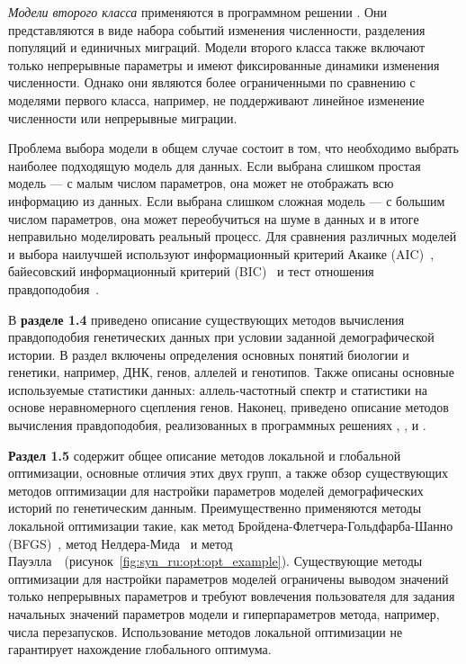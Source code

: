 \textit{Модели второго класса} применяются в программном решении \momi.
Они представляются в виде набора событий изменения численности, разделения популяций и единичных миграций.
Модели второго класса также включают только непрерывные параметры и имеют фиксированные динамики изменения численности.
Однако они являются более ограниченными по сравнению с моделями первого класса, например, не поддерживают линейное изменение численности или непрерывные миграции.

Проблема выбора модели в общем случае состоит в том, что необходимо выбрать наиболее подходящую модель для данных.
Если выбрана слишком простая модель --- с малым числом параметров, она может не отображать всю информацию из данных.
Если выбрана слишком сложная модель --- с большим числом параметров, она может переобучиться на шуме в данных и в итоге неправильно моделировать реальный процесс.
Для сравнения различных моделей и выбора наилучшей используют  информационный критерий Акаике (AIC)~\cite{akaike1974new}, байесовский информационный критерий (BIC)~\cite{schwarz1978estimating} и тест отношения правдоподобия~\cite{vuong1989likelihood}.

В \textbf{разделе 1.4} приведено описание существующих методов вычисления правдоподобия генетических данных при условии заданной демографической истории.
В раздел включены определения основных понятий биологии и генетики, например, ДНК, генов, аллелей и генотипов.
Также описаны основные используемые статистики данных: аллель-частотный спектр и статистики на основе неравномерного сцепления генов.
Наконец, приведено описание методов вычисления правдоподобия, реализованных в программных решениях \dadi, \moments, \momi и \momentsLD.

\textbf{Раздел 1.5} содержит общее описание методов локальной и глобальной оптимизации, основные отличия этих двух групп, а также обзор существующих методов оптимизации для настройки параметров моделей демографических историй по генетическим данным.
Преимущественно применяются методы локальной оптимизации такие, как метод Бройдена-Флетчера-Гольдфарба-Шанно (BFGS)~\cite{broyden1970convergence,fletcher1970new, goldfarb1970family,shanno1970conditioning}, метод Нелдера-Мида~\cite{nelder1965simplex} и метод Пауэлла~\cite{powell1964efficient}~(рисунок~\ref{fig:syn_ru:opt:opt_example}).
Существующие методы оптимизации для настройки параметров моделей ограничены выводом значений только непрерывных параметров и требуют вовлечения пользователя для задания начальных значений параметров модели и гиперпараметров метода, например, числа перезапусков.
Использование методов локальной оптимизации не гарантирует нахождение глобального оптимума.


